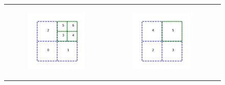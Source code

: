 \begin{figure}
    \centering
    \begin{tabular}{ccc}
        \begin{subfigure}[t]{0.3\textwidth}
            \centering
            \includegraphics[width=\textwidth, clip=true, trim={100 150 100 150}]{figures/adaptive_merge1.pdf}
        \end{subfigure}
        &
        \begin{subfigure}[t]{0.3\textwidth}
            \centering
            \includegraphics[width=\textwidth, clip=true, trim={100 150 100 150}]{figures/adaptive_merge2.pdf}

\end{subfigure}
\end{tabular}
\end{figure}
